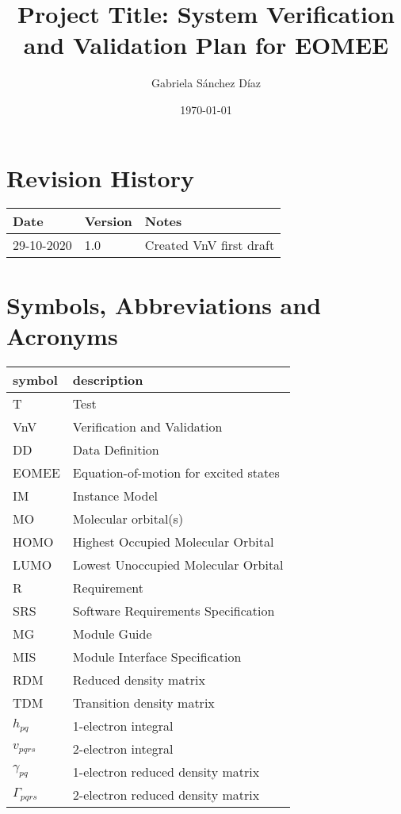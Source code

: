 \documentclass[12pt, titlepage]{article}
\begin{document}
\title{Project Title: System Verification and Validation Plan for EOMEE} 
\author{Gabriela S\'anchez D\'iaz}
\date{\today}
	
\maketitle


\section{Revision History}

\begin{tabularx}{\textwidth}{p{3cm}p{2cm}X}
\toprule {\bf Date} & {\bf Version} & {\bf Notes}\\
\midrule
29-10-2020 & 1.0 & Created VnV first draft \\
\bottomrule
\end{tabularx}

\newpage

\tableofcontents

\listoftables

\listoffigures

\newpage

\section{Symbols, Abbreviations and Acronyms}

\renewcommand{\arraystretch}{1.2}
\begin{tabular}{l l} 
  \toprule		
  \textbf{symbol} & \textbf{description}\\
  \midrule 
  T & Test\\
  VnV & Verification and Validation\\
  DD & Data Definition\\
  EOMEE& Equation-of-motion for excited states\\
  IM & Instance Model\\
  MO & Molecular orbital(s)\\
  HOMO& Highest Occupied Molecular Orbital\\
  LUMO& Lowest Unoccupied Molecular Orbital\\
  R & Requirement\\
  SRS & Software Requirements Specification\\
  MG & Module Guide\\
  MIS & Module Interface Specification\\
  RDM & Reduced density matrix\\
  TDM & Transition density matrix\\
  $h_{pq}$ & 1-electron integral\\
  $v_{pqrs}$ & 2-electron integral\\
  $\gamma_{pq}$ & 1-electron reduced density matrix\\
  $\Gamma_{pqrs}$ & 2-electron reduced density matrix\\
  \bottomrule
\end{tabular}\\
\end{document}
